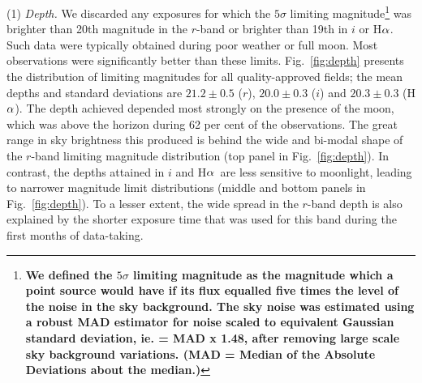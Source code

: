 \documentclass[a4paper,useAMS,usenatbib]{mn2e}
\def\ha{\mbox{H$\rm \alpha$}}
\begin{document}
(1) \emph{Depth.} 
We discarded any exposures 
for which the $5\sigma$ limiting magnitude\footnote{\bf
We defined the $5\sigma$ limiting magnitude
as the magnitude which a point source would have
if its flux equalled five times the level of the noise in the sky background.
The sky noise was estimated using a robust MAD estimator 
for noise scaled to equivalent Gaussian standard deviation,
ie. = MAD x 1.48,
after removing large scale sky background variations.
(MAD = Median of the Absolute Deviations about the median.)}
was brighter than 20th magnitude in the $r$-band
or brighter than 19th in $i$ or \ha.
Such data were typically obtained during poor weather or full moon.
Most observations were significantly better than these limits.
Fig.~\ref{fig:depth} presents the distribution of limiting magnitudes
for all quality-approved fields;
the mean depths and standard deviations are 
$21.2\pm0.5$ ($r$), $20.0\pm0.3$ ($i$) and $20.3\pm0.3$ (\ha).
The depth achieved depended
most strongly on the presence of the moon,
which was above the horizon during 62 per cent 
of the observations.
The great range in sky brightness this
produced is behind the wide and bi-modal shape
of the $r$-band limiting magnitude distribution 
(top panel in Fig.~\ref{fig:depth}).
In contrast, the depths attained in $i$ and \ha\ 
are less sensitive to moonlight, leading to
narrower magnitude limit distributions
(middle and bottom panels in Fig.~\ref{fig:depth}).
To a lesser extent, the wide spread in the $r$-band depth
is also explained by the shorter exposure time
that was used for this band during the first months of data-taking.
\end{document}
